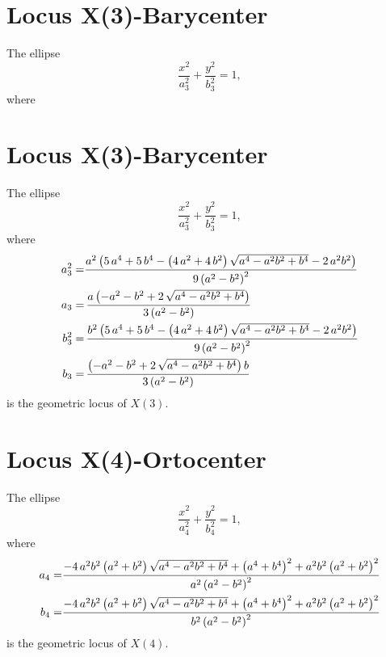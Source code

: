 \documentclass[11pt]{amsart}
\theoremstyle{plain}
\theoremstyle{definition}
\begin{document}
 
  \section{Locus X(3)-Barycenter}
 
 The ellipse \[ \frac{x^2}{a_{3}^2}+\frac{y^2}{b_{3}^2}=1, \]
 where
  
  \section{Locus X(3)-Barycenter}
 
 The ellipse \[ \frac{x^2}{a_{3}^2}+\frac{y^2}{b_{3}^2}=1, \]
 where
 \[\aligned 
 a_3^2=&      {\frac {{a}^{2} \left( 5\,{a}^{4}+5\,{b}^{4}- \left( 4\,{a}^{2}+4
 		\,{b}^{2} \right) \sqrt {{a}^{4}-{a}^{2}{b}^{2}+{b}^{4}}-2\,{a}^{2}{b}
 		^{2} \right) }{ 9\left( {a}^{2}-{b}^{2} \right) ^{2}}}\\
 	a_3=& \,{\frac {a \left( -{a}^{2}-{b}^{2}+2\,\sqrt {{a}^{4}-{a}^{2}{b}^{2
 				}+{b}^{4}} \right) }{3 \left( a^2-b^2 \right)    }}
 \\
 b_3^2=&   \,{\frac {{b}^{2} \left( 5\,{a}^{4}+5\,{b}^{4}- \left( 4\,{a}^{2}+4
 		\,{b}^{2} \right) \sqrt {{a}^{4}-{a}^{2}{b}^{2}+{b}^{4}}-2\,{a}^{2}{b}
 		^{2} \right) }{ 9\left( {a}^{2}-{b}^{2} \right) ^{2}}}\\
 	b_3=&  \,{\frac { \left( -{a}^{2}-{b}^{2}+2\,\sqrt {{a}^{4}-{a}^{2}{b}^{2}
 				+{b}^{4}} \right) b}{3 \left( a^2-b^2 \right)    }}
 \endaligned\] 
 is the geometric locus of $X(3)$.
 
  \section{Locus X(4)-Ortocenter}
 
 The ellipse \[ \frac{x^2}{a_{4}^2}+\frac{y^2}{b_{4}^2}=1, \]
 where
 \[\aligned 
 a_4=&    {\frac {-4\,{a}^{2}{b}^{2} \left( {a}^{2}+{b}^{2} \right) \sqrt {{a}^{
 				4}-{a}^{2}{b}^{2}+{b}^{4}}+ \left( {a}^{4}+{b}^{4} \right) ^{2}+{a}^{2
 		}{b}^{2} \left( {a}^{2}+{b}^{2} \right) ^{2}}{{a}^{2} \left( {a}^{2}-{
 			b}^{2} \right) ^{2}}}
 \\
 b_4=&  {\frac {-4\,{a}^{2}{b}^{2} \left( {a}^{2}+{b}^{2} \right) \sqrt {{a}^{
 				4}-{a}^{2}{b}^{2}+{b}^{4}}+ \left( {a}^{4}+{b}^{4} \right) ^{2}+{a}^{2
 		}{b}^{2} \left( {a}^{2}+{b}^{2} \right) ^{2}}{{b}^{2} \left( {a}^{2}-{
 			b}^{2} \right) ^{2}}}
 \endaligned\] 
 is the geometric locus of $X(4)$.
 
 
\end{document}
